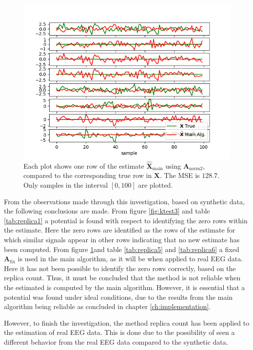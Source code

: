 \begin{figure}[H]
\centering
\includegraphics[scale=0.5]{figures/ch_estimate/k_test5.png}
\caption{Each plot shows one row of the estimate $\hat{\mathbf{X}}_{\text{main}}$ using $\mathbf{A}_{\text{norm2}}$, compared to the corresponding true row in $\mathbf{X}$. The MSE is $128.7$. Only samples in the interval $[0,100]$ are plotted.}
\label{fig:ktest5}
\end{figure}
\noindent
From the observations made through this investigation, based on synthetic data, the following conclusions are made.
From figure \ref{fig:ktest3} and table \ref{tab:replica1} a potential is found with respect to identifying the zero rows within the estimate. 
Here the zero rows are identified as the rows of the estimate for which similar signals appear in other rows indicating that no new estimate has been computed. 
From figure \ref{fig:ktest5}and table \ref{tab:replica5} and \ref{tab:replica6} a fixed $\mathbf{A}_{\text{fix}}$ is used in the main algorithm, as it will be when applied to real EEG data. 
Here it has not been possible to identify the zero rows correctly, based on the replica count. 
Thus, it must be concluded that the method is not reliable when the estimated is computed by the main algorithm. 
However, it is essential that a potential was found under ideal conditions, due to the results from the main algorithm being reliable as concluded in chapter \ref{ch:implementation}. 

However, to finish the investigation, the method replica count has been applied to the estimation of real EEG data. This is done due to the possibility of seen a different behavior from the real EEG data compared to the synthetic data. 

